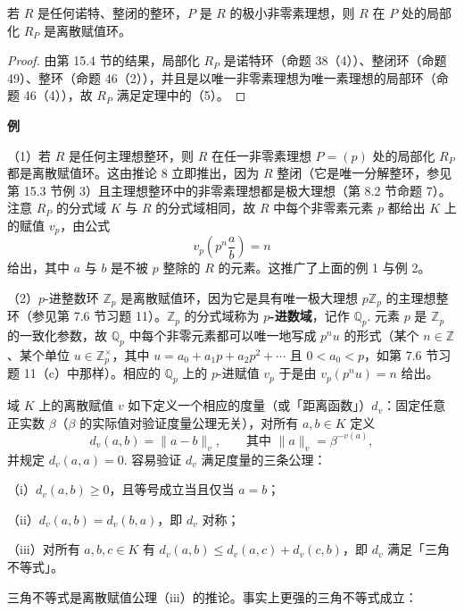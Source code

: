 \begin{corollary}\label{cor:16.8}
若 \(R\) 是任何诺特、整闭的整环，\(P\) 是 \(R\) 的极小非零素理想，则 \(R\) 在 \(P\) 处的局部化 \(R_P\) 是离散赋值环。
\end{corollary}

\begin{proof}
由第 15.4 节的结果，局部化 \(R_P\) 是诺特环（命题 38（4））、整闭环（命题 49）、整环（命题 46（2）），并且是以唯一非零素理想为唯一素理想的局部环（命题 46（4）），故 \(R_P\) 满足定理中的（5）。
\end{proof}

\noindent\textbf{例}

（1）若 \(R\) 是任何主理想整环，则 \(R\) 在任一非零素理想 \(P = (p)\) 处的局部化 \(R_P\) 都是离散赋值环。这由推论 8 立即推出，因为 \(R\) 整闭（它是唯一分解整环，参见第 15.3 节例 3）且主理想整环中的非零素理想都是极大理想（第 8.2 节命题 7）。注意 \(R_P\) 的分式域 \(K\) 与 \(R\) 的分式域相同，故 \(R\) 中每个非零素元素 \(p\) 都给出 \(K\) 上的赋值 \(v_p\)，由公式
\[
v_p\left(p^n\frac{a}{b}\right) = n
\]
给出，其中 \(a\) 与 \(b\) 是不被 \(p\) 整除的 \(R\) 的元素。这推广了上面的例 1 与例 2。

（2）\(p\)-进整数环 \(\mathbb{Z}_p\) 是离散赋值环，因为它是具有唯一极大理想 \(p\mathbb{Z}_p\) 的主理想整环（参见第 7.6 节习题 11）。\(\mathbb{Z}_p\) 的分式域称为 \textbf{\(p\)-进数域}，记作 \(\mathbb{Q}_p\). 元素 \(p\) 是 \(\mathbb{Z}_p\) 的一致化参数，故 \(\mathbb{Q}_p\) 中每个非零元素都可以唯一地写成 \(p^nu\) 的形式（某个 \(n \in \mathbb{Z}\)、某个单位 \(u \in \mathbb{Z}_p^\times\)，其中 \(u = a_0+a_1p+a_2p^2+\cdots\) 且 \(0 < a_0 < p\)，如第 7.6 节习题 11（c）中那样）。相应的 \(\mathbb{Q}_p\) 上的 \(p\)-进赋值 \(v_p\) 于是由 \(v_p(p^nu) = n\) 给出。

域 \(K\) 上的离散赋值 \(v\) 如下定义一个相应的度量（或「距离函数」）\(d_v\)：固定任意正实数 \(\beta\)（\(\beta\) 的实际值对验证度量公理无关），对所有 \(a, b \in K\) 定义
\[
d_v(a, b) = \|a-b\|_v, \qquad \text{其中 } \|a\|_v = \beta^{-v(a)},
\]
并规定 \(d_v(a,a) = 0\). 容易验证 \(d_v\) 满足度量的三条公理：

（i）\(d_v(a,b) \geq 0\)，且等号成立当且仅当 \(a = b\)；

（ii）\(d_v(a,b) = d_v(b,a)\)，即 \(d_v\) 对称；

（iii）对所有 \(a, b, c \in K\) 有 \(d_v(a,b) \leq d_v(a,c)+d_v(c,b)\)，即 \(d_v\) 满足「三角不等式」。

三角不等式是离散赋值公理（iii）的推论。事实上更强的三角不等式成立：

